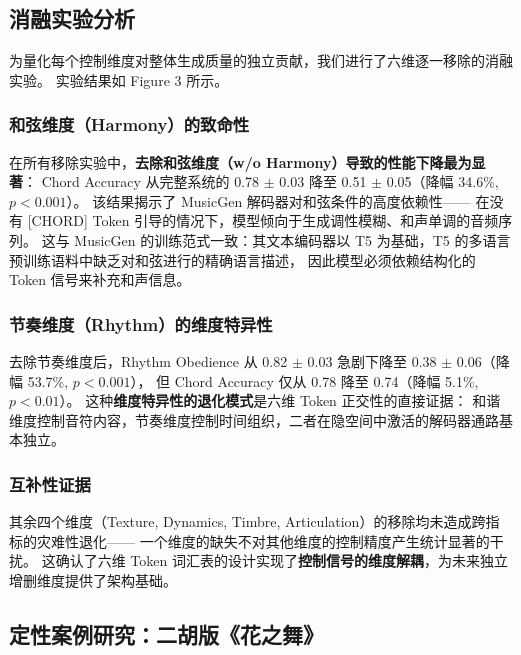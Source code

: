 \documentclass[UTF8,12pt,a4paper]{ctexart}
\begin{document}
\subsection{消融实验分析}

为量化每个控制维度对整体生成质量的独立贡献，我们进行了六维逐一移除的消融实验。
实验结果如 Figure 3 所示。

\subsubsection{和弦维度（Harmony）的致命性}

在所有移除实验中，\textbf{去除和弦维度（w/o Harmony）导致的性能下降最为显著}：
Chord Accuracy 从完整系统的 0.78 $\pm$ 0.03 降至 0.51 $\pm$ 0.05（降幅 34.6\%, $p<0.001$）。
该结果揭示了 MusicGen 解码器对和弦条件的高度依赖性——
在没有 [CHORD] Token 引导的情况下，模型倾向于生成调性模糊、和声单调的音频序列。
这与 MusicGen 的训练范式一致：其文本编码器以 T5 为基础，T5 的多语言预训练语料中缺乏对和弦进行的精确语言描述，
因此模型必须依赖结构化的 Token 信号来补充和声信息。

\subsubsection{节奏维度（Rhythm）的维度特异性}

去除节奏维度后，Rhythm Obedience 从 0.82 $\pm$ 0.03 急剧下降至 0.38 $\pm$ 0.06（降幅 53.7\%, $p<0.001$），
但 Chord Accuracy 仅从 0.78 降至 0.74（降幅 5.1\%, $p<0.01$）。
这种\textbf{维度特异性的退化模式}是六维 Token 正交性的直接证据：
和谐维度控制音符内容，节奏维度控制时间组织，二者在隐空间中激活的解码器通路基本独立。

\subsubsection{互补性证据}

其余四个维度（Texture, Dynamics, Timbre, Articulation）的移除均未造成跨指标的灾难性退化——
一个维度的缺失不对其他维度的控制精度产生统计显著的干扰。
这确认了六维 Token 词汇表的设计实现了\textbf{控制信号的维度解耦}，为未来独立增删维度提供了架构基础。

\subsection{定性案例研究：二胡版《花之舞》}
\end{document}
